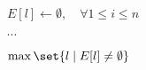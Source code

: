 
\begin{algorithm}[H]
  \begin{algorithmic}[1]
      \State $E[l] \gets \emptyset, \quad \forall 1 \le i \le n$

      \hStatex
        \State $\cdots$
      \EndFor

      \hStatex
      \State \Return $\max \set{l \mid E[l] \neq \emptyset}$
    \EndProcedure
  \end{algorithmic}
\end{algorithm}
